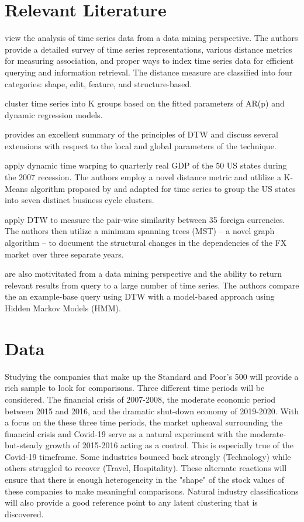 \documentclass[12pt]{article}
\begin{document}
\section{Relevant Literature}

\cite{ElsingAgon2012} view the analysis of time series data from a data mining perspective. The authors provide a detailed survey of time series representations, various distance metrics for measuring association, and proper ways to index time series data for efficient querying and information retrieval. The distance measure are classified into four categories: shape, edit, feature, and structure-based.

\cite{FruhwirthKaufmann2004} cluster time series into K groups based on the fitted parameters of AR(p) and dynamic regression models.

\cite{Mueller2007} provides an excellent summary of the principles of DTW and discuss several extensions with respect to the local and global parameters of the technique.

\cite{FrancesWiemann2020} apply dynamic time warping to quarterly real GDP of the 50 US states during the 2007 recession. The authors employ a novel distance metric and utlilize a K-Means algorithm proposed by \cite{PETITJEAN2011678} and adapted for time series to group the US states into seven distinct business cycle clusters.

\cite{WangXieHanSun2012} apply DTW to measure the pair-wise similarity between 35 foreign currencies. The authors then utilize a minimum spanning trees (MST) -- a novel graph algorithm -- to document the structural changes in the dependencies of the FX market over three separate years.

\cite{KotsifakosAthitsosPapapetrou_2011} are also motivitated from a data mining perspective and the ability to return relevant results from query to a large number of time series. The authors compare the an example-base query using DTW with a model-based approach using Hidden Markov Models (HMM).

\section{Data}

Studying the companies that make up the Standard and Poor's 500 will provide a rich sample to look for comparisons. Three different time periods will be considered. The financial crisis of 2007-2008, the moderate economic period between 2015 and 2016, and the dramatic shut-down economy of 2019-2020. With a focus on the these three time periods, the market upheaval surrounding the financial crisis and Covid-19 serve as a natural experiment with the moderate-but-steady growth of 2015-2016 acting as a control. This is especially true of the Covid-19 timeframe. Some industries bounced back strongly (Technology) while others struggled to recover (Travel, Hospitality). These alternate reactions will ensure that there is enough heterogeneity in the "shape" of the stock values of these companies to make meaningful comparisons. Natural industry classifications will also provide a good reference point to any latent clustering that is discovered.
\end{document}
